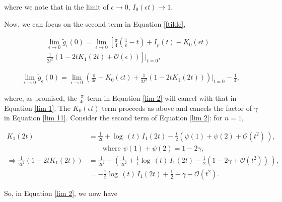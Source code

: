 \documentclass{article}
\numberwithin{equation}{section} %
\begin{document}
\noindent where we note that in the limit of $\epsilon\rightarrow 0$, $I_0(\epsilon t) \rightarrow 1$.

Now, we can focus on the second term in Equation \ref{ftilde},

\begin{equation*}
\begin{split}
\lim_{\epsilon \rightarrow 0}\tilde{g}_\epsilon(0) = \lim_{\epsilon \rightarrow 0} \left[\frac{\pi}{4}\left( \frac{1}{\epsilon} - t\right) + I_p(t) - K_0(\epsilon t) \right. &\\
 \left. \frac{1}{2t^2} \left( 1 - 2tK_1(2t) + \mathcal{O}(\epsilon)\right) \right]\bigg\vert_{t=0},& 
\end{split}
\end{equation*}

\begin{equation}
\begin{split}
\lim_{\epsilon \rightarrow 0}\tilde{g}_\epsilon(0) = \lim_{\epsilon \rightarrow 0} \left( \frac{\pi}{4\epsilon} - K_0(\epsilon t) + \frac{1}{2t^2}(1-2tK_1(2t)) \right)\bigg\vert_{t=0} - \frac{1}{4},
\end{split}
\label{lim 2}
\end{equation}

\noindent where, as promised, the $\frac{\pi}{4\epsilon}$ term in Equation \ref{lim 2} will cancel with that in Equation \ref{lim 1}. The $K_0(\epsilon t)$ term proceeds as above and cancels the factor of $\gamma$ in Equation \ref{lim 11}. Consider the second term of Equation \ref{lim 2}: for $n=1$,

\begin{equation}
\begin{split}
K_1(2t) &= \frac{1}{2t} + \log\,(t) \,I_1(2t)  - \frac{t}{2}\left(\psi(1) + \psi(2) + \mathcal{O}(t^2)\, \right),\\
& \quad \quad \mathrm{where \,} \,\psi(1) + \psi(2) = 1-2\gamma,\\
\Rightarrow \frac{1}{2t^2} ( 1 - 2t K_1(2t)) &= \frac{1}{2t^2} - \left( \frac{1}{2t^2} + \frac{1}{t} \log\,(t) \,I_1(2t)  - \frac{1}{2}(1-2\gamma + \mathcal{O}(t^2))\,\right),\\
&= -\frac{1}{t} \log\,(t) \,I_1(2t)  + \frac{1}{2} - \gamma - \mathcal{O}(t^2).
\end{split}
\end{equation}

So, in Equation \ref{lim 2}, we now have
\end{document}
